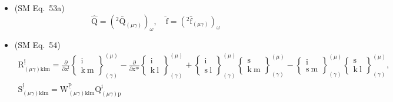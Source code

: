 \documentclass[
    12pt,              %
    a4paper,           %
    headings=normal,   %
    twoside=true,      %
    BCOR=8mm,          %
]{scrbook}
\begin{document}
\begin{itemize}[label={},leftmargin=0pt]
    \item (SM Eq.\ 53a) 
    \[
    \widehat{\mathrm{Q}} = \left( {}^2\bar{\mathrm{Q}}_{(\mu\gamma)} \right)_\omega, \quad \hat{\mathrm{f}} = \left( {}^2\bar{\mathrm{f}}_{(\mu\gamma)} \right)_\omega
    \]

    \item (SM Eq.\ 54) 
    \[
    \begin{gathered}
    \mathrm{R}^{\underline{\mathrm{i}}}_{(\mu\gamma)\mathrm{klm}} = \frac{\partial}{\partial \mathrm{x}^{\underline{\mathrm{l}}}}\left\{ \begin{smallmatrix} \mathrm{i} \\ \mathrm{k\ m} \end{smallmatrix} \right\}^{(\mu)}_{(\gamma)} - \frac{\partial}{\partial \mathrm{x}^{\underline{\mathrm{m}}}}\left\{ \begin{smallmatrix} \mathrm{i} \\ \mathrm{k\ l} \end{smallmatrix} \right\}^{(\mu)}_{(\gamma)} + \left\{ \begin{smallmatrix} \mathrm{i} \\ \mathrm{s\ l} \end{smallmatrix} \right\}^{(\mu)}_{(\gamma)}\left\{ \begin{smallmatrix} \mathrm{s} \\ \mathrm{k\ m} \end{smallmatrix} \right\}^{(\mu)}_{(\gamma)} - \left\{ \begin{smallmatrix} \mathrm{i} \\ \mathrm{s\ m} \end{smallmatrix} \right\}^{(\mu)}_{(\gamma)}\left\{ \begin{smallmatrix} \mathrm{s} \\ \mathrm{k\ l} \end{smallmatrix} \right\}^{(\mu)}_{(\gamma)}, \\
    \mathrm{S}^{\underline{\mathrm{i}}}_{(\mu\gamma)\mathrm{klm}} = \mathrm{W}^{\underline{\mathrm{p}}}_{(\mu\gamma)\mathrm{klm}} \mathrm{Q}^{\underline{\mathrm{i}}}_{(\mu\gamma)\mathrm{p}}
    \end{gathered}
    \]


\end{itemize}
\end{document}
